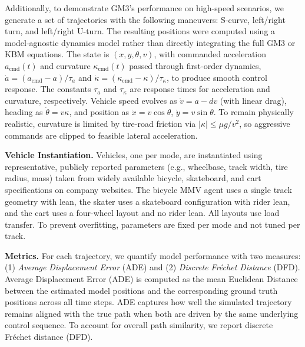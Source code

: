 \documentclass[letterpaper, 10 pt, conference]{ieeeconf}  %
\begin{document}
Additionally, to demonstrate GM3's performance on high-speed scenarios, we generate a set of trajectories with the following maneuvers: S-curve, left/right turn, and left/right U-turn. The resulting positions were computed using a model-agnostic dynamics model rather than directly integrating the full GM3 or KBM equations. The state is $(x,y,\theta,v)$, with commanded acceleration $a_{\mathrm{cmd}}(t)$ and curvature $\kappa_{\mathrm{cmd}}(t)$ passed through first-order dynamics, $\dot a=(a_{\mathrm{cmd}}-a)/\tau_a$ and $\dot\kappa=(\kappa_{\mathrm{cmd}}-\kappa)/\tau_\kappa$, to produce smooth control response. The constants $\tau_a$ and $\tau_\kappa$ are response times for acceleration and curvature, respectively. Vehicle speed evolves as $\dot v=a-dv$ (with linear drag), heading as $\dot\theta=v\kappa$, and position as $\dot x=v\cos\theta$, $\dot y=v\sin\theta$. To remain physically realistic, curvature is limited by tire-road friction via $|\kappa|\le \mu g / v^2$, so aggressive commands are clipped to feasible lateral acceleration.

\textbf{Vehicle Instantiation.}
Vehicles, one per mode, are instantiated using representative, publicly reported parameters (e.g., wheelbase, track width, tire radius, mass) taken from widely available bicycle, skateboard, and cart specifications on company websites. The bicycle MMV agent uses a single track geometry with lean, the skater uses a skateboard configuration with rider lean, and the cart uses a four-wheel layout and no rider lean. All layouts use load transfer. To prevent overfitting, parameters are fixed per mode and not tuned per track. 

\textbf{Metrics.}
For each trajectory, we quantify model performance with two measures: (1) {\em Average Displacement Error} (ADE) and (2) {\em Discrete Fréchet Distance} (DFD). Average Displacement Error (ADE) is computed as the mean Euclidean Distance between the estimated model positions and the corresponding ground truth positions across all time steps. ADE captures how well the simulated trajectory remains aligned with the true path when both are driven by the same underlying control sequence. To account for overall path similarity, we report discrete Fréchet distance (DFD).
\end{document}
